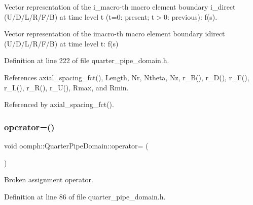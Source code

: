 Vector representation of the i\+\_\+macro-\/th macro element boundary i\+\_\+direct (U/\+D/\+L/\+R/\+F/B) at time level t (t=0\+: present; t$>$0\+: previous)\+: f(s). 

Vector representation of the imacro-\/th macro element boundary idirect (U/\+D/\+L/\+R/\+F/B) at time level t\+: f(s) 

Definition at line 222 of file quarter\+\_\+pipe\+\_\+domain.\+h.



References axial\+\_\+spacing\+\_\+fct(), Length, Nr, Ntheta, Nz, r\+\_\+\+B(), r\+\_\+\+D(), r\+\_\+\+F(), r\+\_\+\+L(), r\+\_\+\+R(), r\+\_\+\+U(), Rmax, and Rmin.



Referenced by axial\+\_\+spacing\+\_\+fct().

\mbox{\label{classoomph_1_1QuarterPipeDomain_ab6aec719fb0b333abf3ef9a1bf0414ac}} 
\subsubsection{\texorpdfstring{operator=()}{operator=()}}
{\footnotesize\ttfamily void oomph\+::\+Quarter\+Pipe\+Domain\+::operator= (\begin{DoxyParamCaption}\item[{const \hyperlink{classoomph_1_1QuarterPipeDomain}{Quarter\+Pipe\+Domain} \&}]{ }\end{DoxyParamCaption})\hspace{0.3cm}{\ttfamily [inline]}}



Broken assignment operator. 



Definition at line 86 of file quarter\+\_\+pipe\+\_\+domain.\+h.

\mbox{\label{classoomph_1_1QuarterPipeDomain_aba1af5e7f1bc6e88ff8e9ee59e965630}} 
